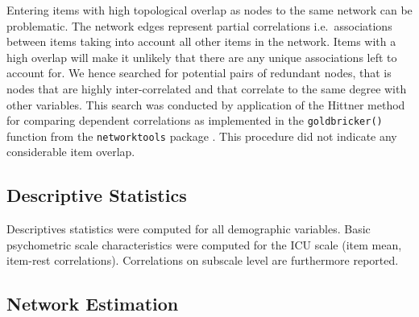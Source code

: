 \documentclass[a4paper,12pt]{article} %
\begin{document}
Entering items with high topological overlap as nodes to the same network can be problematic.
The network edges represent partial correlations i.e.~associations between items taking into account all other items in the network.
Items with a high overlap will make it unlikely that there are any unique associations left to account for.
We hence searched for potential pairs of redundant nodes, that is nodes that are highly inter-correlated and that correlate to the same degree with other variables.  
This search was conducted by application of the Hittner method for comparing dependent correlations \parencite{hittner_monte_2003} as implemented in the \texttt{goldbricker()} function from the \texttt{networktools} package \parencite{networktools}.
This procedure did not indicate any considerable item overlap.





\subsection{Descriptive Statistics}
Descriptives statistics were computed for all demographic variables.
Basic psychometric scale characteristics were computed for the ICU scale (item mean, item-rest correlations).
Correlations on subscale level are furthermore reported.


\subsection{Network Estimation}
\end{document}
